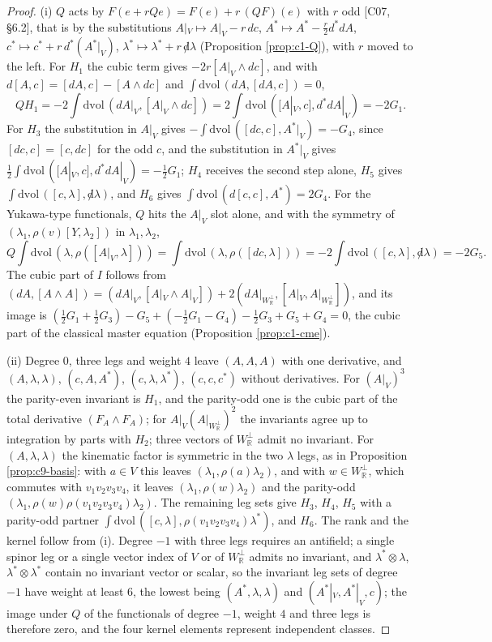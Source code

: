 \begin{proof}
(i) $Q$ acts by $F(e+rQe)=F(e)+r\,(QF)(e)$ with $r$ odd [C07, §6.2], that is by the substitutions $A|_V\mapsto A|_V-r\,dc$, $A^*\mapsto A^*-\tfrac r2d^*dA$, $c^*\mapsto c^*+r\,d^*(A^*|_V)$, $\lambda^*\mapsto\lambda^*+r\,{\not d}\lambda$ (Proposition \ref{prop:c1-Q}), with $r$ moved to the left. For $H_1$ the cubic term gives $-2r[A|_V\wedge dc]$, and with $d[A,c]=[dA,c]-[A\wedge dc]$ and $\int\mathrm{dvol}\,(dA,[dA,c])=0$,
\[
QH_1=-2\int\mathrm{dvol}\,(dA|_V,[A|_V\wedge dc])=2\int\mathrm{dvol}\,([A|_V,c],d^*dA|_V)=-2G_1 .
\]
For $H_3$ the substitution in $A|_V$ gives $-\int\mathrm{dvol}\,([dc,c],A^*|_V)=-G_4$, since $[dc,c]=[c,dc]$ for the odd $c$, and the substitution in $A^*|_V$ gives $\tfrac12\int\mathrm{dvol}\,([A|_V,c],d^*dA|_V)=-\tfrac12G_1$; $H_4$ receives the second step alone, $H_5$ gives $\int\mathrm{dvol}\,([c,\lambda],{\not d}\lambda)$, and $H_6$ gives $\int\mathrm{dvol}\,(d[c,c],A^*)=2G_4$. For the Yukawa-type functionals, $Q$ hits the $A|_V$ slot alone, and with the symmetry of $(\lambda_1,\rho(v)[Y,\lambda_2])$ in $\lambda_1,\lambda_2$,
\[
Q\int\mathrm{dvol}\,(\lambda,\rho([A|_V,\lambda]))=\int\mathrm{dvol}\,(\lambda,\rho([dc,\lambda]))=-2\int\mathrm{dvol}\,([c,\lambda],{\not d}\lambda)=-2G_5 .
\]
The cubic part of $I$ follows from $(dA,[A\wedge A])=(dA|_V,[A|_V\wedge A|_V])+2(dA|_{W_{\mathbb R}^\perp},[A|_V,A|_{W_{\mathbb R}^\perp}])$, and its image is $(\tfrac12G_1+\tfrac12G_3)-G_5+(-\tfrac12G_1-G_4)-\tfrac12G_3+G_5+G_4=0$, the cubic part of the classical master equation (Proposition \ref{prop:c1-cme}).

(ii) Degree $0$, three legs and weight $4$ leave $(A,A,A)$ with one derivative, and $(A,\lambda,\lambda)$, $(c,A,A^*)$, $(c,\lambda,\lambda^*)$, $(c,c,c^*)$ without derivatives. For $(A|_V)^3$ the parity-even invariant is $H_1$, and the parity-odd one is the cubic part of the total derivative $(F_A\wedge F_A)$; for $A|_V(A|_{W_{\mathbb R}^\perp})^2$ the invariants agree up to integration by parts with $H_2$; three vectors of $W_{\mathbb R}^\perp$ admit no invariant. For $(A,\lambda,\lambda)$ the kinematic factor is symmetric in the two $\lambda$ legs, as in Proposition \ref{prop:c9-basis}: with $a\in V$ this leaves $(\lambda_1,\rho(a)\lambda_2)$, and with $w\in W_{\mathbb R}^\perp$, which commutes with $v_1v_2v_3v_4$, it leaves $(\lambda_1,\rho(w)\lambda_2)$ and the parity-odd $(\lambda_1,\rho(w)\rho(v_1v_2v_3v_4)\lambda_2)$. The remaining leg sets give $H_3$, $H_4$, $H_5$ with a parity-odd partner $\int\mathrm{dvol}\,([c,\lambda],\rho(v_1v_2v_3v_4)\lambda^*)$, and $H_6$. The rank and the kernel follow from (i). Degree $-1$ with three legs requires an antifield; a single spinor leg or a single vector index of $V$ or of $W_{\mathbb R}^\perp$ admits no invariant, and $\lambda^*\otimes\lambda$, $\lambda^*\otimes\lambda^*$ contain no invariant vector or scalar, so the invariant leg sets of degree $-1$ have weight at least $6$, the lowest being $(A^*,\lambda,\lambda)$ and $(A^*|_V,A^*|_V,c)$; the image under $Q$ of the functionals of degree $-1$, weight $4$ and three legs is therefore zero, and the four kernel elements represent independent classes.


\end{proof}
